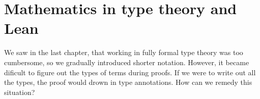 \documentclass[a4paper, 12pt]{article}
\newcommand{\N}{\mathbb{N}}
\newcommand{\B}{\mathbb{B}}
\newcommand{\Prop}{\mathit{Prop}}
\renewcommand{\Prop}{\mathit{Prop}}
\newcommand{\la}[1]{\lambda{#1}.\,}
\theoremstyle{changedot}
\theoremstyle{changedotbreak}
\theoremstyle{nonumberplain}
\newtheorem{proof}{Proof}
\begin{document}













\section{Mathematics in type theory and Lean}
We saw in the last chapter, that working in fully formal type theory was too cumbersome, so we gradually introduced shorter notation. However, it became dificult to figure out the types of terms during proofs. If we were to write out all the types, the proof would drown in type annotations. How can we remedy this situation?
\end{document}
